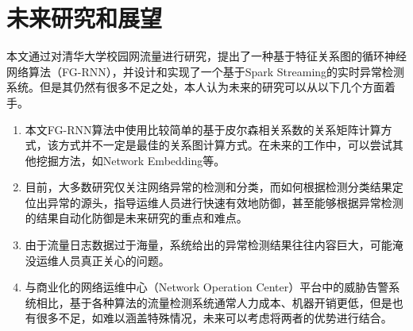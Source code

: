 \section{未来研究和展望}
本文通过对清华大学校园网流量进行研究，提出了一种基于特征关系图的循环神经网络算法（FG-RNN），并设计和实现了一个基于Spark Streaming的实时异常检测系统。但是其仍然有很多不足之处，本人认为未来的研究可以从以下几个方面着手。
\begin{enumerate}
    \item 本文FG-RNN算法中使用比较简单的基于皮尔森相关系数的关系矩阵计算方式，该方式并不一定是最佳的关系图计算方式。在未来的工作中，可以尝试其他挖掘方法，如Network Embedding等。
    \item 目前，大多数研究仅关注网络异常的检测和分类，而如何根据检测分类结果定位出异常的源头，指导运维人员进行快速有效地防御，甚至能够根据异常检测的结果自动化防御是未来研究的重点和难点。
    \item 由于流量日志数据过于海量，系统给出的异常检测结果往往内容巨大，可能淹没运维人员真正关心的问题。
    \item 与商业化的网络运维中心（Network Operation Center）平台中的威胁告警系统相比，基于各种算法的流量检测系统通常人力成本、机器开销更低，但是也有很多不足，如难以涵盖特殊情况，未来可以考虑将两者的优势进行结合。
\end{enumerate}
